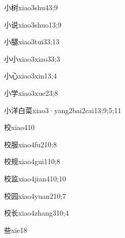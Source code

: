 \begin{verbete}{小树}{xiao3shu4}{3;9}
\end{verbete}
\begin{verbete}{小说}{xiao3shuo1}{3;9}
\end{verbete}
\begin{verbete}{小腿}{xiao3tui3}{3;13}
\end{verbete}
\begin{verbete}{小小}{xiao3xiao3}{3;3}
\end{verbete}
\begin{verbete}{小心}{xiao3xin1}{3;4}
\end{verbete}
\begin{verbete}{小学}{xiao3xue2}{3;8}
\end{verbete}
\begin{verbete}{小洋白菜}{xiao3·yang2bai2cai1}{3;9;5;11}
\end{verbete}
\begin{verbete}{校}{xiao4}{10}
\end{verbete}
\begin{verbete}{校服}{xiao4fu2}{10;8}
\end{verbete}
\begin{verbete}{校规}{xiao4gui1}{10;8}
\end{verbete}
\begin{verbete}{校监}{xiao4jian4}{10;10}
\end{verbete}
\begin{verbete}{校园}{xiao4yuan2}{10;7}
\end{verbete}
\begin{verbete}{校长}{xiao4zhang3}{10;4}
\end{verbete}
\begin{verbete}{些}{xie1}{8}
\end{verbete}
